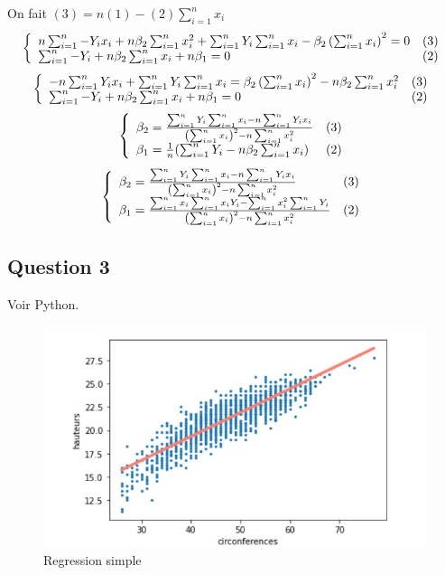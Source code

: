 \documentclass[]{book}
\theoremstyle{definition}
\begin{document}
On fait $(3) = n(1)-(2)\sum_{i=1}^{n}{x_i}$
$$
\left\{
\begin{array}{l l}
n\sum_{i=1}^{n}{-Y_ix_i}+n\beta_2\sum_{i=1}^{n}{x_i^2}+\sum_{i=1}^{n}{Y_i}\sum_{i=1}^{n}{x_i} -\beta_2\left(\sum_{i=1}^{n}{x_i}\right)^2 = 0 & (3)\\
\sum_{i=1}^{n}{-Y_i} +n\beta_2\sum_{i=1}^{n}{x_i}+n\beta_1 = 0 & (2)
\end{array}
\right.
$$
$$
\left\{
\begin{array}{l l}
-n\sum_{i=1}^{n}{Y_ix_i} + \sum_{i=1}^{n}{Y_i}\sum_{i=1}^{n}{x_i} = \beta_2\left(\sum_{i=1}^{n}{x_i}\right)^2 -n\beta_2\sum_{i=1}^{n}{x_i^2}  & (3)\\
\sum_{i=1}^{n}{-Y_i} +n\beta_2\sum_{i=1}^{n}{x_i}+n\beta_1 = 0 & (2)
\end{array}
\right.
$$
$$
\left\{
\begin{array}{l l}
\beta_2 = \frac{\sum_{i=1}^{n}{Y_i}\sum_{i=1}^{n}{x_i}-n\sum_{i=1}^{n}{Y_ix_i}}{\left(\sum_{i=1}^{n}{x_i}\right)^2 -n\sum_{i=1}^{n}{x_i^2}}  & (3)\\
\beta_1 = \frac{1}{n}(\sum_{i=1}^{n}{Y_i} - n\beta_2\sum_{i=1}^{n}{x_i}) & (2)
\end{array}
\right.
$$
$$
\left\{
\begin{array}{l l}
\beta_2 = \frac{\sum_{i=1}^{n}{Y_i}\sum_{i=1}^{n}{x_i}-n\sum_{i=1}^{n}{Y_ix_i}}{\left(\sum_{i=1}^{n}{x_i}\right)^2 -n\sum_{i=1}^{n}{x_i^2}}  & (3)\\
\beta_1 = \frac{\sum_{i=1}^{n}{x_i}\sum_{i=1}^{n}{x_iY_i}-\sum_{i=1}^{n}{x_i^2}\sum_{i=1}^{n}{Y_i}}{\left(\sum_{i=1}^{n}{x_i}\right)^2 -n\sum_{i=1}^{n}{x_i^2}} & (2)
\end{array}
\right.
$$

\subsection*{Question 3}
Voir Python.
\begin{figure}
	\includegraphics[scale=1]{regression_simple.jpg}
    \caption{Regression simple}
    \label{fig:regression simple}
\end{figure}
\end{document}
